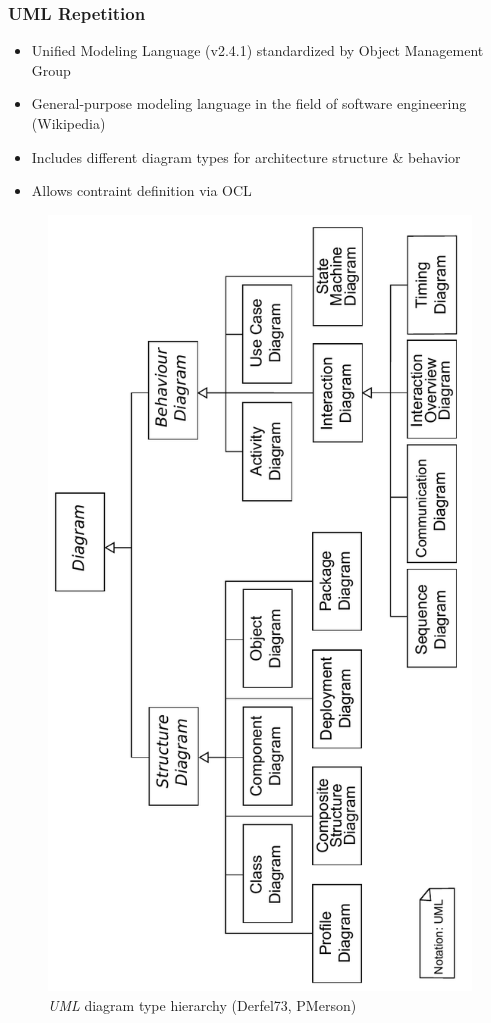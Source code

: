 \documentclass{beamer}
\begin{document}
\begin{frame}
 \frametitle{UML Repetition}
 \begin{itemize}
  \item Unified Modeling Language (v2.4.1) standardized by Object Management Group \cite{man:UML}
  \item General-purpose modeling language in the field of software engineering (Wikipedia)
  \item Includes different diagram types for architecture structure \& behavior
  \item Allows contraint definition via OCL \cite{man:OCL}
 \end{itemize}
\begin{figure}[h!t]
 \centering
 \includegraphics[scale=0.3,angle=270]{images/uml}
 \caption{\textit{UML} diagram type hierarchy (Derfel73, PMerson)}
 \label{fig:uml}
\end{figure}
\end{frame}
\end{document}
